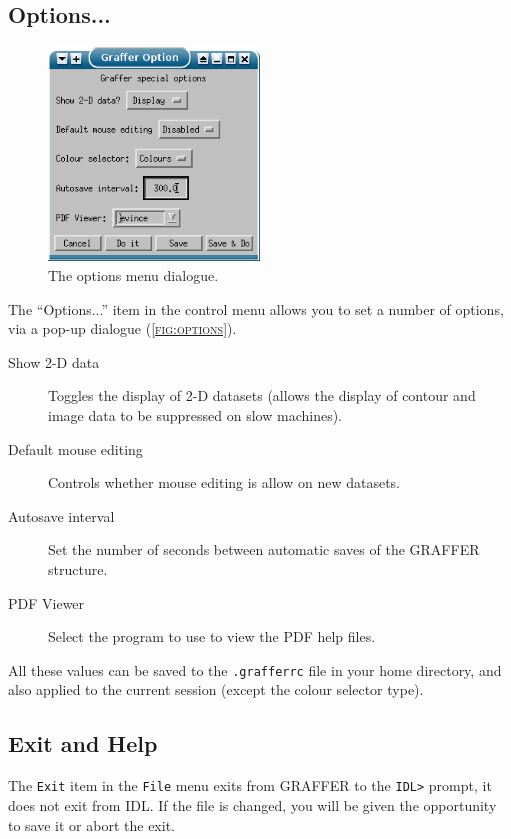 \documentclass[11pt,twoside,english]{article}
\begin{document}
\subsection{Options...}
\label{sec:options}

\begin{figure}
  \centering
  \includegraphics[width=0.5\textwidth]{options}
  \caption{The options menu dialogue.}
  \label{fig:options}
\end{figure}
The ``Options...'' item in the control menu allows you to set a number
of options, via a pop-up dialogue (\textsc{\autoref{fig:options}}).

\begin{description}
\item[Show 2-D data] Toggles the display of 2-D datasets (allows the
  display of contour and image data to be suppressed on slow machines).
\item[Default mouse editing] Controls whether mouse editing is allow on
  new datasets.
\item[Autosave interval] Set the number of seconds between automatic
  saves of the GRAFFER structure.
\item[PDF Viewer] Select the program to use to view the PDF help files.
\end{description}

All these values can be saved to the \texttt{.grafferrc} file in your
home directory, and also applied to the current session (except the
colour selector type).

\subsection{Exit and Help}

The \texttt{Exit} item in the \texttt{File} menu exits from GRAFFER to
the \texttt{IDL>} prompt, it does not exit from IDL. If the file is
changed, you will be given the opportunity to save it or abort the
exit.
\end{document}
